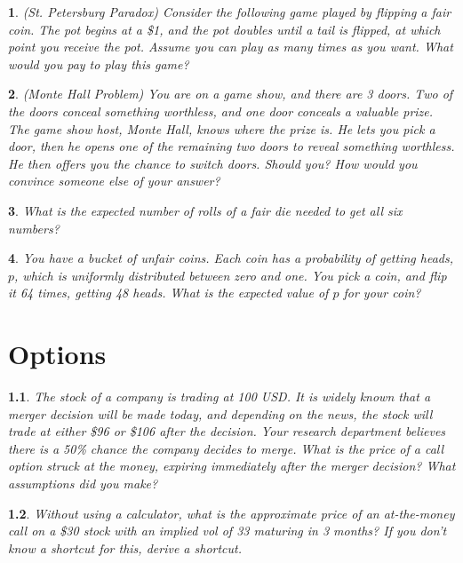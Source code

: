 \documentclass{report}
\newtheorem{problem}{}
\numberwithin{problem}{chapter} %
\begin{document}
\begin{problem}
(St. Petersburg Paradox) Consider the following game played by flipping a fair coin. The pot begins at a \$1, and the pot doubles until a tail is flipped, at which point you receive the pot. Assume you can play as many times as you want. What would you pay to play this game? 
\end{problem}

\begin{problem}
(Monte Hall Problem) You are on a game show, and there are 3 doors. Two of the doors conceal something worthless, and one door conceals a valuable prize. The game show host, Monte Hall, knows where the prize is. He lets you pick a door, then he opens one of the remaining two doors to reveal something worthless. He then offers you the chance to switch doors. Should you? How would you convince someone else of your answer?
\end{problem}

\begin{problem}
What is the expected number of rolls of a fair die needed to get all six numbers?
\end{problem}

\begin{problem}
You have a bucket of unfair coins. Each coin has a probability of getting heads, $p$, which is uniformly distributed between zero and one. You pick a coin, and flip it 64 times, getting 48 heads. What is the expected value of $p$ for your coin? 
\end{problem}

\chapter{Options}

\begin{problem}
The stock of a company is trading at 100 USD. It is widely known that a merger decision will be made today, and depending on the news, the stock will trade at either \$96 or \$106 after the decision. Your research department believes there is a 50\% chance
        the company decides to merge. What is the price of a call option struck at the money, expiring immediately after the merger decision? What assumptions did you make?
\end{problem}

\begin{problem}
Without using a calculator, what is the approximate price of an at-the-money call on a \$30 stock with an implied vol of 33 maturing in 3 months? If you don't know a shortcut for this, derive a shortcut.
\end{problem}
\end{document}
